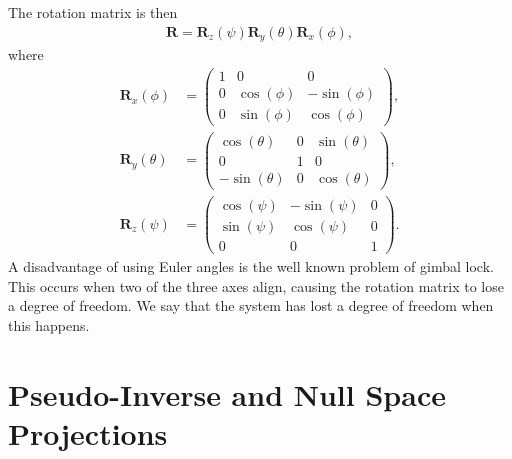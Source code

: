 The rotation matrix is then \cite{modsim}
\begin{align}
    \bm{R} = \bm{R}_z(\psi) \bm{R}_y(\theta) \bm{R}_x(\phi),
\end{align}
where
\begin{subequations}
\begin{align}
    \bm{R}_x(\phi) &= \begin{pmatrix}
        1 & 0 & 0 \\
        0 & \cos(\phi) & -\sin(\phi) \\
        0 & \sin(\phi) & \cos(\phi)
    \end{pmatrix}, \\
    \bm{R}_y(\theta) &= \begin{pmatrix}
        \cos(\theta) & 0 & \sin(\theta) \\
        0 & 1 & 0 \\
        -\sin(\theta) & 0 & \cos(\theta)
    \end{pmatrix}, \\
    \bm{R}_z(\psi) &= \begin{pmatrix}
        \cos(\psi) & -\sin(\psi) & 0 \\
        \sin(\psi) & \cos(\psi) & 0 \\
        0 & 0 & 1
    \end{pmatrix}.
\end{align}
\end{subequations}
A disadvantage of using Euler angles is the well known problem of gimbal lock.
This occurs when two of the three axes align, causing the rotation matrix to lose
a degree of freedom. We say that the system has lost a degree of freedom when this
happens.




\section{Pseudo-Inverse and Null Space Projections}
\label{sec:pseudoinverse}

